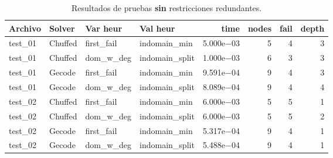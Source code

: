 \begin{compactfloats}
\begin{table}[H]
  \centering
  \small
  \setlength{\tabcolsep}{10.8pt}
  \caption{Resultados de pruebas \textbf{sin} restricciones redundantes.}
  \label{tab:pruebas-kakuro-off}
  \begin{tabular}{l l l l r r r r}
    \toprule
    \textbf{Archivo} & \textbf{Solver} & \textbf{Var heur} & \textbf{Val heur} & \textbf{time} & \textbf{nodes} & \textbf{fail} & \textbf{depth} \\
    \midrule
    test\_01 & Chuffed & first\_fail  & indomain\_min   & 5.000e$-$03 & 5 & 4 & 3 \\
    test\_01 & Chuffed & dom\_w\_deg  & indomain\_split & 1.000e$-$03 & 6 & 3 & 3 \\
    test\_01 & Gecode  & first\_fail  & indomain\_min   & 9.591e$-$04 & 9 & 4 & 3 \\
    test\_01 & Gecode  & dom\_w\_deg  & indomain\_split & 8.089e$-$04 & 9 & 4 & 4 \\
    \midrule
    test\_02 & Chuffed & first\_fail  & indomain\_min   & 6.000e$-$03 & 5 & 5 & 1 \\
    test\_02 & Chuffed & dom\_w\_deg  & indomain\_split & 6.000e$-$03 & 5 & 5 & 2 \\
    test\_02 & Gecode  & first\_fail  & indomain\_min   & 5.317e$-$04 & 9 & 4 & 1 \\
    test\_02 & Gecode  & dom\_w\_deg  & indomain\_split & 5.488e$-$04 & 9 & 4 & 1 \\
    \bottomrule
  \end{tabular}
\end{table}
\end{compactfloats}

\FloatBarrier

